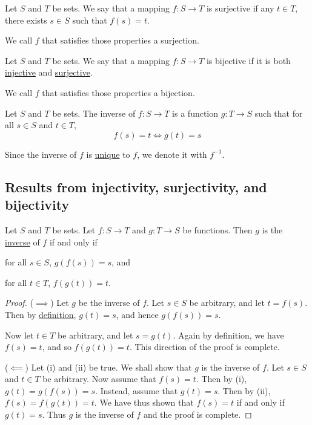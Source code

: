 Let $S$ and $T$ be sets. We say that a mapping $f:S\to T$ is surjective if any
$t\in T$, there exists $s\in S$ such that $f(s)=t$.

We call $f$ that satisfies those properties a surjection.

\label{d205f32}

Let $S$ and $T$ be sets. We say that a mapping $f:S\to T$ is bijective if it is
both \href{ac44d1d}{injective} and \href{bd75843}{surjective}.

We call $f$ that satisfies those properties a bijection.

\label{e5e7679}

Let $S$ and $T$ be sets. The inverse of $f:S\to T$ is a function $g:T\to S$
such that for all $s\in S$ and $t\in T$,
$$
  f(s)=t\iff g(t)=s
$$

Since the inverse of $f$ is \href{ed51751}{unique} to $f$, we denote it with
$f^{-1}$.

\subsection{Results from injectivity, surjectivity, and bijectivity}\label{a8d371f}

\label{f5ae640}

Let $S$ and $T$ be sets. Let $f:S\to T$ and $g:T\to S$ be functions. Then $g$
is the \href{e5e7679}{inverse} of $f$ if and only if
\begin{enumerati}
  \item for all $s\in S$, $g(f(s))=s$, and
  \item for all $t\in T$, $f(g(t))=t$.
\end{enumerati}

\begin{proof}
  ($\implies$) Let $g$ be the inverse of $f$. Let $s\in S$ be arbitrary, and let
  $t=f(s)$. Then by \href{e5e7679}{definition}, $g(t)=s$, and hence $g(f(s))=s$.

  Now let $t\in T$ be arbitrary, and let $s=g(t)$. Again by definition, we have
  $f(s)=t$, and so $f(g(t))=t$. This direction of the proof is complete.

  ($\impliedby$) Let (i) and (ii) be true. We shall show that $g$ is the inverse
  of $f$. Let $s\in S$ and $t\in T$ be arbitrary. Now assume that $f(s)=t$. Then
  by (i), $g(t)=g(f(s))=s$. Instead, assume that $g(t)=s$. Then by (ii),
  $f(s)=f(g(t))=t$. We have thus shown that $f(s)=t$ if and only if $g(t)=s$.
  Thus $g$ is the inverse of $f$ and the proof is complete.
\end{proof}

